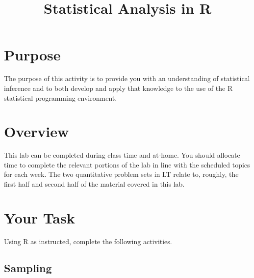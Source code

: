 \documentclass[a4paper,12pt]{article}
\title{Statistical Analysis in R}
\author{}
\date{}
\begin{document}
\maketitle

\section{Purpose}

The purpose of this activity is to provide you with an understanding of statistical inference and to both develop and apply that knowledge to the use of the R statistical programming environment.

\section{Overview}

This lab can be completed during class time and at-home. You should allocate time to complete the relevant portions of the lab in line with the scheduled topics for each week. The two quantitative problem sets in LT relate to, roughly, the first half and second half of the material covered in this lab.

\section{Your Task}

Using R as instructed, complete the following activities.

\subsection{Sampling}
\end{document}
